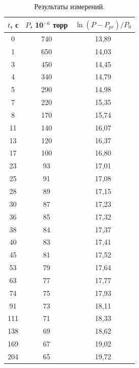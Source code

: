 \documentclass[a4paper,12pt]{article} %
\begin{document}
\begin{table}[H]
\caption{Результаты измерений.}
\label{table:results_upgrade}
\begin{tabular}{|c|c|c|}
\hline
$t$, с & $P$, 10$^{-6}$ торр & $\ln {(P-P_{pr})/P_0}$ \\ \hline
0      & 740              & 13,89                 \\ \hline
1      & 650              & 14,03                 \\ \hline
3      & 450              & 14,45                 \\ \hline
4      & 340              & 14,79                 \\ \hline
5      & 290              & 14,98                 \\ \hline
7      & 220              & 15,35                 \\ \hline
8      & 170              & 15,74                 \\ \hline
11     & 140              & 16,07                 \\ \hline
13     & 120              & 16,37                 \\ \hline
17     & 100              & 16,80                 \\ \hline
23     & 93               & 17,01                 \\ \hline
25     & 91               & 17,08                 \\ \hline
28     & 89               & 17,15                 \\ \hline
30     & 87               & 17,23                 \\ \hline
36     & 85               & 17,32                 \\ \hline
38     & 84               & 17,37                 \\ \hline
40     & 83               & 17,41                 \\ \hline
45     & 81               & 17,52                 \\ \hline
53     & 79               & 17,64                 \\ \hline
63     & 77               & 17,77                 \\ \hline
74     & 75               & 17,93                 \\ \hline
91     & 73               & 18,11                 \\ \hline
111    & 71               & 18,33                 \\ \hline
138    & 69               & 18,62                 \\ \hline
169    & 67               & 19,02                 \\ \hline
204    & 65               & 19,72                 \\ \hline
\end{tabular}
\end{table}
\end{document}

